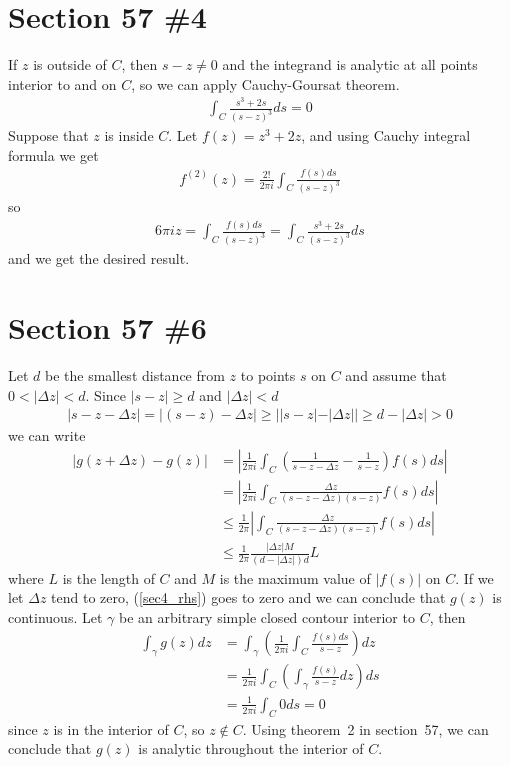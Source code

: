 \documentclass{scrartcl}
\begin{document}
\section{Section 57 \#4}
If \(z\) is outside of \(C\), then \(s - z \not = 0\) and the integrand is analytic at all points interior to and on \(C\), so we can apply Cauchy-Goursat theorem.
\begin{align*}
  \int_C \frac{s^3 + 2s}{(s - z)^3} ds = 0
\end{align*}
Suppose that \(z\) is inside \(C\).
Let \(f(z) = z^3 + 2z\), and using Cauchy integral formula we get
\begin{align*}
  f^{(2)}(z) = \frac{2!}{2\pi i} \int_C \frac{f(s) ds}{(s - z)^3}
\end{align*}
so
\begin{align*}
  6\pi iz = \int_C \frac{f(s) ds}{(s - z)^3} = \int_C \frac{s^3 + 2s}{(s - z)^3} ds
\end{align*}
and we get the desired result.

\section{Section 57 \#6}
Let \(d\) be the smallest distance from \(z\) to points \(s\) on \(C\) and assume that \(0 < |\Delta z| < d\).
Since \(|s - z| \geq d\) and \(|\Delta z| < d\)
\begin{align}\label{sec4_ineq}
  |s - z - \Delta z| = |(s - z) - \Delta z| \geq ||s - z| - |\Delta z|| \geq d - |\Delta z| > 0
\end{align}
we can write
\begin{align}
  \nonumber |g(z + \Delta z) - g(z)| &= \left| \frac{1}{2\pi i} \int_C \left( \frac{1}{s - z - \Delta z} - \frac{1}{s - z} \right) f(s) ds \right| \\
  \nonumber                          &= \left| \frac{1}{2\pi i} \int_C \frac{\Delta z}{(s - z - \Delta z)(s - z)} f(s) ds \right| \\
  \nonumber                          &\leq \frac{1}{2\pi} \left| \int_C \frac{\Delta z}{(s - z - \Delta z)(s - z)} f(s) ds \right| \\
  \label{sec4_rhs}                   &\leq \frac{1}{2\pi} \frac{|\Delta z|M}{(d - |\Delta z|)d} L
\end{align}
where \(L\) is the length of \(C\) and \(M\) is the maximum value of \(|f(s)|\) on \(C\).
If we let \(\Delta z\) tend to zero, (\ref{sec4_rhs}) goes to zero and we can conclude that \(g(z)\) is continuous.
Let \(\gamma\) be an arbitrary simple closed contour interior to \(C\), then
\begin{align*}
  \int_\gamma g(z) dz &= \int_\gamma \left( \frac{1}{2\pi i} \int_C \frac{f(s) ds}{s - z} \right) dz \\
                      &= \frac{1}{2\pi i} \int_C \left( \int_\gamma \frac{f(s)}{s - z} dz \right) ds \\
                      &= \frac{1}{2\pi i} \int_C 0 ds = 0
\end{align*}
since \(z\) is in the interior of \(C\), so \(z \not \in C\).
Using theorem~2 in section~57, we can conclude that \(g(z)\) is analytic throughout the interior of \(C\).
\end{document}
